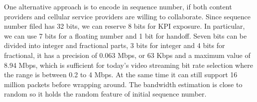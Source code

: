 One alternative approach is to encode in sequence number, if both content providers and cellular service providers are willing to collaborate. Since sequence number filed has 32 bits, we can reserve 8 bits for KPI exposure. In particular, we can use 7 bits for a floating number and 1 bit for handoff. Seven bits can be divided into integer and fractional parts, 3 bits for integer and 4 bits for fractional, it has a precision of 0.063 Mbps, or 63 Kbps and a maximum value of 8.94 Mbps, which is sufficient for today's video streaming bit rate selection where the range is between 0.2 to 4 Mbps.
At the same time it can still support 16 million packets before wrapping around. The bandwidth estimation is close to random so it holds the random feature of initial sequence number.




